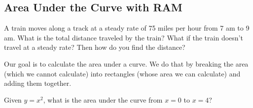 \documentclass[addpoints, 12pt]{exam}
\begin{document}
\newpage
{}
\subsection*{Area Under the Curve with RAM}
A train moves along a track at a steady rate of 75 miles per hour from 7 am to 9 am. What is the total distance traveled by the train? What if the train doesn't travel at a steady rate? Then how do you find the distance?

Our goal is to calculate the area under a curve. We do that by breaking the area (which we cannot calculate) into rectangles (whose area we can calculate) and adding them together.

\begin{questions}
    
    \question Given $y=x^2$, what is the area under the curve from $x=0$ to $x=4$?
    

\end{questions}
\end{document}
